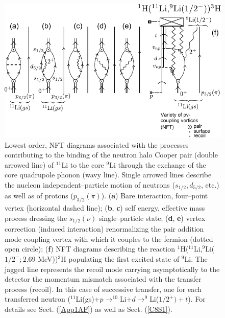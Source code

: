           \begin{figure}
          \centerline {
          \includegraphics*[width=12cm]{introduccion/figs/figintro5x}
          }
          \caption{Lowest order, NFT diagrams associated with the processes contributing  to the binding of the neutron halo Cooper pair (double arrowed line) of $^{11}$Li to the core $^9$Li through the exchange of the core quadrupole phonon (wavy line). Single arrowed lines describe the nucleon independent--particle motion of neutrons ($s_{1/2},d_{5/2}$, etc.) as well as of protons ($p_{3/2}(\pi)$). (\textbf{a}) Bare interaction, four--point vertex (horizontal dashed line); (\textbf{b}, \textbf{c}) self energy, effective mass process dressing the $s_{1/2}(\nu)$ single--particle state; (\textbf{d}, \textbf{e}) vertex correction (induced interaction) renormalizing the pair addition mode coupling vertex with which it couples to the fermion (dotted open circle); (\textbf{f}) NFT diagrams describing the reaction $^1$H($^{11}$Li,$^9$Li($1/2^-; 2.69$ MeV))$^3$H populating the first excited state of $^9$Li. The jagged line represents the recoil mode carrying asymptotically to the  detector the momentum mismatch associated with the transfer process (recoil). In this case of successive transfer, one for each transferred neutron ($^{11}$Li(gs)+$p\rightarrow^{10}$Li+$d\rightarrow^9$Li($1/2^+)+t$). For details see Sect. (\ref{App1AF}) as well as Sect. (\ref{C8S1}).}
          \label{figintro5}
          \end{figure}
